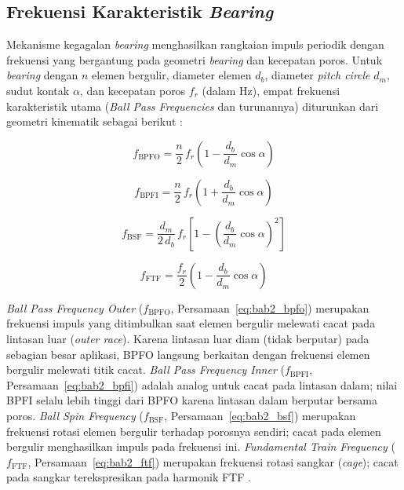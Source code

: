 \subsection{Frekuensi Karakteristik \emph{Bearing}}
\label{subsec:bab2_bpfx}

Mekanisme kegagalan \emph{bearing} menghasilkan rangkaian impuls periodik dengan
frekuensi yang bergantung pada geometri \emph{bearing} dan kecepatan poros. Untuk
\emph{bearing} dengan $n$ elemen bergulir, diameter elemen $d_b$, diameter
\emph{pitch circle} $d_m$, sudut kontak $\alpha$, dan kecepatan poros $f_r$
(dalam Hz), empat frekuensi karakteristik utama (\emph{Ball Pass Frequencies}
dan turunannya) diturunkan dari geometri kinematik sebagai berikut
:

\begin{equation}
  f_{\text{BPFO}} = \frac{n}{2}\, f_r \left(1 - \frac{d_b}{d_m}\cos\alpha\right)
  \label{eq:bab2_bpfo}
\end{equation}

\begin{equation}
  f_{\text{BPFI}} = \frac{n}{2}\, f_r \left(1 + \frac{d_b}{d_m}\cos\alpha\right)
  \label{eq:bab2_bpfi}
\end{equation}

\begin{equation}
  f_{\text{BSF}} = \frac{d_m}{2\,d_b}\, f_r
    \left[1 - \left(\frac{d_b}{d_m}\cos\alpha\right)^{\!2}\right]
  \label{eq:bab2_bsf}
\end{equation}

\begin{equation}
  f_{\text{FTF}} = \frac{f_r}{2} \left(1 - \frac{d_b}{d_m}\cos\alpha\right)
  \label{eq:bab2_ftf}
\end{equation}

\emph{Ball Pass Frequency Outer} ($f_\text{BPFO}$, Persamaan~\eqref{eq:bab2_bpfo})
merupakan frekuensi impuls yang ditimbulkan saat elemen bergulir melewati
cacat pada lintasan luar (\emph{outer race}). Karena lintasan luar diam
(tidak berputar) pada sebagian besar aplikasi, BPFO langsung berkaitan dengan
frekuensi elemen bergulir melewati titik cacat. \emph{Ball Pass Frequency
Inner} ($f_\text{BPFI}$, Persamaan~\eqref{eq:bab2_bpfi}) adalah analog untuk
cacat pada lintasan dalam; nilai BPFI selalu lebih tinggi dari BPFO karena
lintasan dalam berputar bersama poros. \emph{Ball Spin Frequency}
($f_\text{BSF}$, Persamaan~\eqref{eq:bab2_bsf}) merupakan frekuensi rotasi
elemen bergulir terhadap porosnya sendiri; cacat pada elemen bergulir
menghasilkan impuls pada frekuensi ini. \emph{Fundamental Train Frequency}
($f_\text{FTF}$, Persamaan~\eqref{eq:bab2_ftf}) merupakan frekuensi rotasi
sangkar (\emph{cage}); cacat pada sangkar terekspresikan pada harmonik FTF
.

